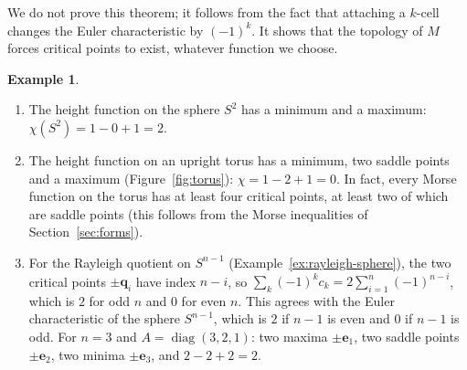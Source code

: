 \documentclass[11pt]{article}
\theoremstyle{definition}
\newtheorem{example}[definition]{Example}
\theoremstyle{plain}
\theoremstyle{remark}
\DeclareMathOperator{\diag}{diag}
\begin{document}
We do not prove this theorem; it follows from the fact that attaching a $k$-cell changes the Euler characteristic by $(-1)^k$. It shows that the topology of $M$ forces critical points to exist, whatever function we choose.

\begin{example}\label{ex:morse-relation}
    \begin{enumerate}
        \item The height function on the sphere $S^2$ has a minimum and a maximum: $\chi(S^2) = 1 - 0 + 1 = 2$.
        \item The height function on an upright torus has a minimum, two saddle points and a maximum (Figure~\ref{fig:torus}): $\chi = 1 - 2 + 1 = 0$. In fact, every Morse function on the torus has at least four critical points, at least two of which are saddle points (this follows from the Morse inequalities of Section~\ref{sec:forms}).
        \item For the Rayleigh quotient on $S^{n-1}$ (Example~\ref{ex:rayleigh-sphere}), the two critical points $\pm\mathbf{q}_i$ have index $n - i$, so $\sum_k (-1)^k c_k = 2\sum_{i=1}^n (-1)^{n-i}$, which is $2$ for odd $n$ and $0$ for even $n$. This agrees with the Euler characteristic of the sphere $S^{n-1}$, which is $2$ if $n - 1$ is even and $0$ if $n - 1$ is odd. For $n = 3$ and $A = \diag(3, 2, 1)$: two maxima $\pm\mathbf{e}_1$, two saddle points $\pm\mathbf{e}_2$, two minima $\pm\mathbf{e}_3$, and $2 - 2 + 2 = 2$.
    \end{enumerate}
\end{example}
\end{document}

